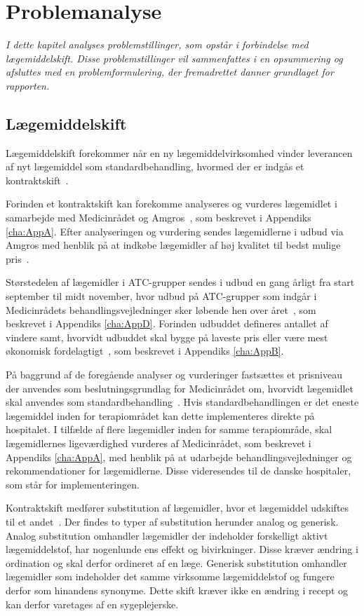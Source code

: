 \chapter{Problemanalyse}
\textit{I dette kapitel analyses problemstillinger, som opstår i forbindelse med lægemiddelskift. Disse problemstillinger vil sammenfattes i en opsummering og afsluttes med en problemformulering, der fremadrettet danner  grundlaget for rapporten.}

\section{Lægemiddelskift}
Lægemiddelskift forekommer når en ny lægemiddelvirksomhed vinder leverancen af nyt lægemiddel som standardbehandling, hvormed der er indgås et kontraktskift~\citep{Amgros2015}. 

Forinden et kontraktskift kan forekomme analyseres og vurderes lægemidlet i samarbejde med Medicinrådet og Amgros~\citep{DanskeRegioner2016}, som beskrevet i Appendiks \ref{cha:AppA}. Efter analyseringen og vurdering sendes lægemidlerne i udbud via Amgros med henblik på at indkøbe lægemidler af høj kvalitet til bedst mulige pris~\citep{Sygehusapoteket2017}.

Størstedelen af lægemidler i ATC-grupper sendes i udbud en gang årligt fra start september til midt november, hvor udbud på ATC-grupper som indgår i Medicinrådets behandlingsvejledninger sker løbende hen over året~\citep{Sygehusapoteket2017}, som beskrevet i Appendiks \ref{cha:AppD}.
Forinden udbuddet defineres antallet af vindere samt, hvorvidt udbuddet skal bygge på laveste pris eller være mest økonomisk fordelagtigt~\citep{Amgros2018a}, som beskrevet i Appendiks \ref{cha:AppB}.

På baggrund af de foregående analyser og vurderinger fastsættes et prisniveau der anvendes som beslutningsgrundlag for Medicinrådet om, hvorvidt lægemidlet skal anvendes som standardbehandling~\citep{DanskeRegioner2016}. Hvis standardbehandlingen er det eneste lægemiddel inden for terapiområdet kan dette implementeres direkte på hospitalet. I tilfælde af flere lægemidler inden for samme terapiområde, skal lægemidlernes ligeværdighed vurderes af Medicinrådet, som beskrevet i Appendiks \ref{cha:AppA}, med henblik på at udarbejde behandlingsvejledninger og rekommendationer for lægemidlerne. Disse videresendes til de danske hospitaler, som står for implementeringen.~\citep{DanskeRegioner2016}

Kontraktskift medfører substitution af lægemidler, hvor et lægemiddel udskiftes til et andet~\citep{DanskSelskabforPatientsikkerhed2009}. Der findes to typer af substitution herunder analog og generisk.
Analog substitution omhandler lægemidler der indeholder forskelligt aktivt lægemiddelstof, har nogenlunde ens effekt og bivirkninger. Disse kræver ændring i ordination og skal derfor ordineret af en læge. Generisk substitution omhandler lægemidler som indeholder det samme virksomme lægemiddelstof og fungere derfor som hinandens synonyme. Dette skift kræver ikke en ændring i recept og kan derfor varetages af en sygeplejerske.~\citep{DanskSelskabforPatientsikkerhed2009}

